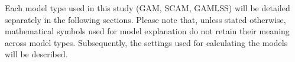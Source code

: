 Each model type used in this study (GAM, SCAM, GAMLSS) will be detailed separately in the following sections.  Please note that, unless stated otherwise, mathematical symbols used for model explanation do not retain their meaning across model types.  Subsequently, the settings used for calculating the models will be described.

